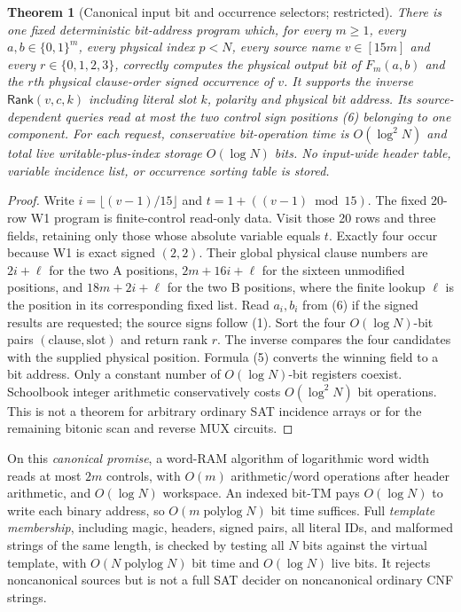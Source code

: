 \documentclass[11pt]{article}
\newtheorem{theorem}{Theorem}
\newcommand{\Rank}{\mathsf{Rank}}
\begin{document}
\begin{theorem}[Canonical input bit and occurrence selectors; restricted]\label{th:index}
There is one fixed deterministic bit-address program which, for every
$m\ge1$, every $a,b\in\{0,1\}^m$, every physical index $p<N$, every
source name $v\in[15m]$ and every $r\in\{0,1,2,3\}$,
correctly computes the physical output bit of $F_m(a,b)$ and the $r$th
\emph{physical clause-order} signed occurrence of $v$. It supports the
inverse $\Rank(v,c,k)$ including literal slot $k$, polarity and physical
bit address. Its source-dependent queries read at most the two control
sign positions (6) belonging to one component. For each request,
conservative bit-operation time is $O(\log^2 N)$ and total live
writable-plus-index storage $O(\log N)$ bits. No input-wide header table,
variable incidence list, or occurrence sorting table is stored.
\end{theorem}
\begin{proof}
Write $i=\lfloor(v-1)/15\rfloor$ and
$t=1+((v-1)\bmod15)$. The fixed 20-row W1 program is finite-control
read-only data. Visit those 20 rows and three fields, retaining only
those whose absolute variable equals $t$. Exactly four occur because W1
is exact signed $(2,2)$. Their global physical clause numbers are
$2i+\ell$ for the two A positions, $2m+16i+\ell$ for the sixteen
unmodified positions, and $18m+2i+\ell$ for the two B positions,
where the finite lookup $\ell$ is the position in its corresponding
fixed list. Read $a_i,b_i$ from (6) if the signed results are requested;
the source signs follow (1). Sort the four $O(\log N)$-bit pairs
$(\mathrm{clause},\mathrm{slot})$ and return rank $r$.
The inverse compares the four candidates with the supplied physical
position. Formula (5) converts the winning field to a bit address.
Only a constant number of $O(\log N)$-bit registers coexist.
Schoolbook integer arithmetic conservatively costs
$O(\log^2N)$ bit operations. This is not a theorem for arbitrary
ordinary SAT incidence arrays or for the remaining bitonic scan and
reverse MUX circuits.
\end{proof}

On this \emph{canonical promise}, a word-RAM algorithm of logarithmic
word width reads at most $2m$ controls, with $O(m)$ arithmetic/word
operations after header arithmetic, and $O(\log N)$ workspace.
An indexed bit-TM pays $O(\log N)$ to write each binary address,
so $O(m\operatorname{polylog}N)$ bit time suffices.
Full \emph{template membership}, including magic, headers, signed pairs,
all literal IDs, and malformed strings of the same length, is checked
by testing all $N$ bits against the virtual template, with
$O(N\operatorname{polylog}N)$ bit time and $O(\log N)$ live bits.
It rejects noncanonical sources but is not a full SAT decider on
noncanonical ordinary CNF strings.
\end{document}
